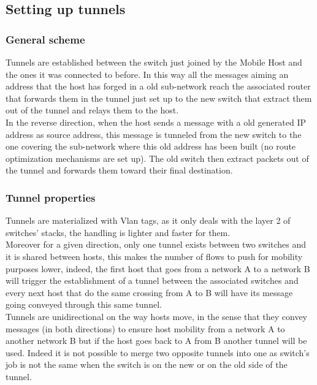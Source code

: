\documentclass{article}
\begin{document}
\subsection{Setting up tunnels}

\subsubsection{General scheme}
Tunnels are established between the switch just joined by the Mobile
Host and the ones it was connected to before. In this way all the
messages aiming an address that the host has forged in a old
sub-network reach the associated router that forwards them in the
tunnel just set up to the new switch that extract them out of the
tunnel and relays them to the host.\\ 
\newline
In the reverse direction, when the host sends a message with a old
generated IP address as source address, this message is tunneled from
the new switch to the one covering the sub-network where this old
address has been built (no route optimization mechanisms are set
up). The old switch then extract packets out of the tunnel and
forwards them toward their final destination.

\subsubsection{Tunnel properties}

Tunnels are materialized with Vlan tags, as it only deals with the
layer 2 of switches' stacks, the handling is lighter and faster for
them.\\ 
\newline
Moreover for a given direction, only one tunnel exists between
two switches and it is shared between hosts, this makes the number of
flows to push for mobility purposes lower, indeed, the first host that
goes from a network A to a network B will trigger the establishment of
a tunnel between the associated switches and every next host that do
the same crossing from A to B will have its message going conveyed
through this same tunnel.\\ 
\newline
Tunnels are unidirectional on the way hosts move, in the sense that
they convey messages (in both directions) to ensure host mobility from
a network A to another network B but if the host goes back to A from B
another tunnel will be used. Indeed it is not possible to merge two
opposite tunnels into one as switch's job is not the same when the
switch is on the new or on the old side of the tunnel.
\end{document}
